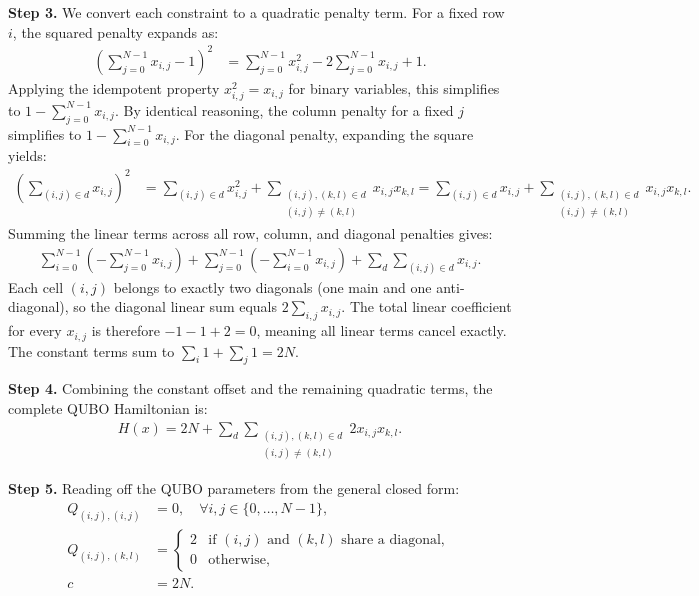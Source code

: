 \documentclass[12pt]{article}
\begin{document}
\textbf{Step 3.} We convert each constraint to a quadratic penalty term. For a fixed row $i$, the squared penalty expands as:
\begin{align}
\left(\sum_{j=0}^{N-1} x_{i,j} - 1\right)^2 &= \sum_{j=0}^{N-1} x_{i,j}^2 - 2\sum_{j=0}^{N-1} x_{i,j} + 1.
\end{align}
Applying the idempotent property $x_{i,j}^2 = x_{i,j}$ for binary variables, this simplifies to $1 - \sum_{j=0}^{N-1} x_{i,j}$. By identical reasoning, the column penalty for a fixed $j$ simplifies to $1 - \sum_{i=0}^{N-1} x_{i,j}$. For the diagonal penalty, expanding the square yields:
\begin{align}
\left(\sum_{(i,j) \in d} x_{i,j}\right)^2 &= \sum_{(i,j) \in d} x_{i,j}^2 + \sum_{\substack{(i,j),(k,l) \in d \\ (i,j) \neq (k,l)}} x_{i,j} x_{k,l} = \sum_{(i,j) \in d} x_{i,j} + \sum_{\substack{(i,j),(k,l) \in d \\ (i,j) \neq (k,l)}} x_{i,j} x_{k,l}.
\end{align}
Summing the linear terms across all row, column, and diagonal penalties gives:
\begin{align}
\sum_{i=0}^{N-1} \left(-\sum_{j=0}^{N-1} x_{i,j}\right) + \sum_{j=0}^{N-1} \left(-\sum_{i=0}^{N-1} x_{i,j}\right) + \sum_{d} \sum_{(i,j) \in d} x_{i,j}.
\end{align}
Each cell $(i,j)$ belongs to exactly two diagonals (one main and one anti-diagonal), so the diagonal linear sum equals $2\sum_{i,j} x_{i,j}$. The total linear coefficient for every $x_{i,j}$ is therefore $-1 -1 + 2 = 0$, meaning all linear terms cancel exactly. The constant terms sum to $\sum_{i} 1 + \sum_{j} 1 = 2N$.

\textbf{Step 4.} Combining the constant offset and the remaining quadratic terms, the complete QUBO Hamiltonian is:
\begin{align}
H(x) = 2N + \sum_{d} \sum_{\substack{(i,j),(k,l) \in d \\ (i,j) \neq (k,l)}} 2 x_{i,j} x_{k,l}.
\end{align}

\textbf{Step 5.} Reading off the QUBO parameters from the general closed form:
\begin{align}
Q_{(i,j),(i,j)} &= 0, \quad \forall i,j \in \{0,\dots,N-1\}, \\
Q_{(i,j),(k,l)} &= \begin{cases} 2 & \text{if } (i,j) \text{ and } (k,l) \text{ share a diagonal}, \\ 0 & \text{otherwise}, \end{cases} \\
c &= 2N.
\end{align}
\end{document}
